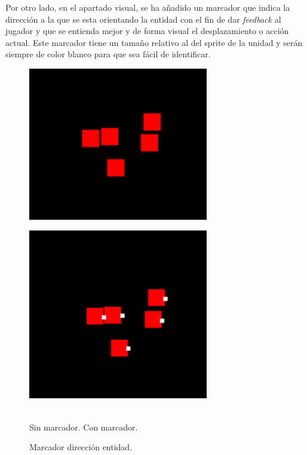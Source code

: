 Por otro lado, en el apartado visual, se ha añadido un marcador que indica la dirección a la
que se esta orientando la entidad con el fin de dar \textit{feedback} al jugador y que se 
entienda mejor y de forma visual el desplazamiento o acción actual. Este marcador tiene un 
tamaño relativo al del sprite de la unidad y serán siempre de color blanco para que sea
fácil de identificar. 

\begin{figure}[h]
\centering
\begin{minipage}[c]{0.42\linewidth}
	\hspace{9mm}
	\includegraphics[width=0.7\textwidth]{imagenes/diario_desarrollo/sin-marcador.png} \\
	\label{sin_marcador}
\end{minipage}
\begin{minipage}[c]{0.40\linewidth}
	\hspace{9mm}
	\includegraphics[width=0.7\textwidth]{imagenes/diario_desarrollo/marcador.png} \\
	\label{marcador}
\end{minipage} \\
	\hspace{0.5cm} Sin marcador. \hspace{3.5cm} Con marcador. 
\caption{Marcador dirección entidad.}
\end{figure}

